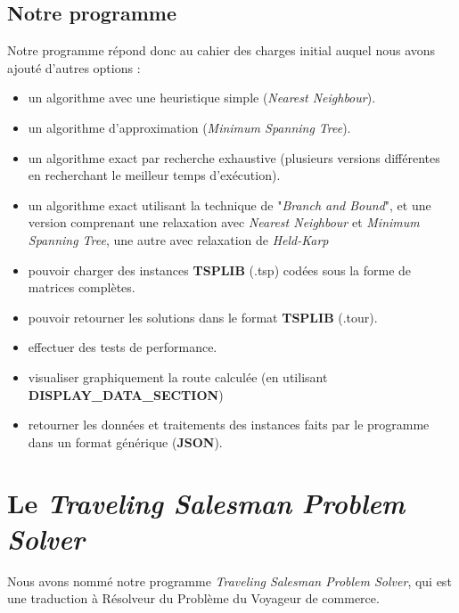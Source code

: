 \documentclass[12pt]{report}
\begin{document}
\section{Notre programme}

Notre programme répond donc au cahier des charges initial auquel nous avons ajouté d'autres options : 
\begin{itemize}
   \item un algorithme avec une heuristique simple (\textit{Nearest Neighbour}).
   \item un algorithme d'approximation (\textit{Minimum Spanning Tree}).
   \item un algorithme exact par recherche exhaustive (plusieurs versions différentes en recherchant le meilleur temps d'exécution).
   \item un algorithme exact utilisant la technique de "\textit{Branch and Bound}", et une version comprenant une relaxation avec \textit{Nearest Neighbour} et \textit{Minimum Spanning Tree}, une autre avec relaxation de \textit{Held-Karp}
   \item pouvoir charger des instances \textbf{TSPLIB} (.tsp) codées sous la forme de matrices complètes. 
   \item pouvoir retourner les solutions dans le format \textbf{TSPLIB} (.tour).
   \item effectuer des tests de performance.
   \item visualiser graphiquement la route calculée (en utilisant \textbf{DISPLAY\_DATA\_SECTION})
   \item retourner les données et traitements des instances faits par le programme dans un format générique (\textbf{JSON}).
\end{itemize}






\chapter{Le \textit{Traveling Salesman Problem Solver}}

Nous avons nommé notre programme \textit{Traveling Salesman Problem Solver}, qui est une traduction à Résolveur du Problème du Voyageur de commerce.
\end{document}
